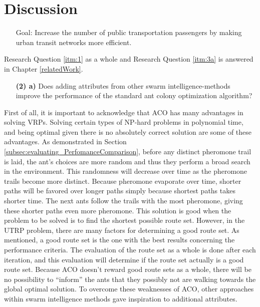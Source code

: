 \section{Discussion}
\begin{itemize}
\item[Goal:]  Increase the number of public transportation passengers by making urban transit networks more efficient.
\end{itemize}
Research Question \vref{itm:1} as a whole and Research Question \vref{itm:3a} is answered in Chapter \vref{relatedWork}.

\begin{itemize}
\item[\textbf{(2) a)}] Does adding attributes from other swarm intelligence-methods improve the performance of the standard ant colony optimization algorithm?
\end{itemize}

First of all, it is important to acknowledge that ACO has many advantages in solving VRPs. Solving certain types of NP-hard problems in polynomial time, and being optimal given there is no absolutely correct solution are some of these advantages. As demonstrated in Section \vref{subsec:evaluating_PerfomanceComparison}, before  any distinct pheromone trail is laid, the ant's choices are more random and thus they perform a broad search in the environment. This randomness will decrease over time as the pheromone trails become more distinct. Because pheromone evaporate over time, shorter paths will be favored over longer paths simply because shortest paths takes shorter time. The next ants follow the trails with the most pheromone, giving these shorter paths even more pheromone. This solution is good when the problem to be solved is to find the shortest possible route set. However, in the UTRP problem, there are many factors for determining a good route set. As mentioned, a good route set is the one with the best results concerning the performance criteria. The evaluation of the route set as a whole is done after each iteration, and this evaluation will determine if the route set actually is a good route set. Because ACO doesn't reward good route sets as a whole, there will be no possibility to ``inform'' the ants that they possibly not are walking towards the global optimal solution. To overcome these weaknesses of ACO, other approaches within swarm intelligence methods gave inspiration to additional attributes. 

